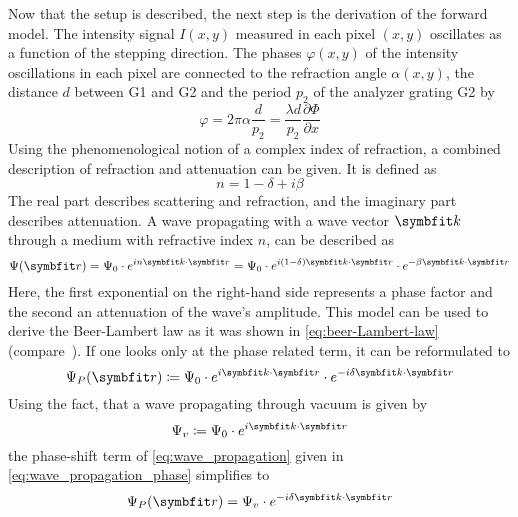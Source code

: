 Now that the setup is described, the next step is the derivation of the forward model. The intensity
signal \(I(x, y)\) measured in each pixel \((x, y)\) oscillates as a function of the stepping
direction. The phases \(\varphi(x, y)\) of the intensity oscillations in each pixel are connected to
the refraction angle \(\alpha(x, y)\), the distance \(d\) between G1 and G2 and the period \(p_2\)
of the analyzer grating G2 by~\cite{weitkamp_x-ray_2005}
\begin{equation}
	\varphi = 2 \pi \alpha \frac{d}{p_2} = \frac{\lambda d}{p_2} \frac{\partial \Phi}{\partial x}
\end{equation}
Using the phenomenological notion of a complex index of refraction, a combined description of
refraction and attenuation can be given. It is defined as
\begin{equation}
	n = 1 - \delta + i \beta
\end{equation}
The real part describes scattering and refraction, and the imaginary part describes attenuation. A
wave propagating with a wave vector \(\mvec{k}\) through a medium with refractive index \(n\), can
be described as
\begin{equation}\label{eq:wave_propagation}
	\Psi(\mvec{r}) = \Psi_0 \cdot e^{i n \mvec{k} \cdot \mvec{r}} = \Psi_0 \cdot e^{i(1-\delta)\mvec{k} \cdot \mvec{r}} \cdot e^{-\beta \mvec{k} \cdot \mvec{r}}
\end{equation}
Here, the first exponential on the right-hand side represents a phase factor and the second an
attenuation of the wave's amplitude. This model can be used to derive the Beer-Lambert law as it was
shown in \autoref{eq:beer-Lambert-law} (compare~\cite[Chapter~2.1]{hahn_statistical_2014}). If one
looks only at the phase related term, it can be reformulated to
\begin{equation}\label{eq:wave_propagation_phase}
	\Psi_P(\mvec{r}) \coloneq \Psi_0 \cdot e^{i \mvec{k} \cdot \mvec{r}} \cdot e^{-i\delta \mvec{k} \cdot \mvec{r}}
\end{equation}
Using the fact, that a wave propagating through vacuum is given by
\begin{equation}
	\Psi_v \coloneq \Psi_0 \cdot e^{i \mvec{k} \cdot \mvec{r}}
\end{equation}
the phase-shift term of \autoref{eq:wave_propagation} given in \autoref{eq:wave_propagation_phase}
simplifies to
\begin{equation}
	\Psi_P(\mvec{r}) = \Psi_v \cdot e^{-i\delta \mvec{k} \cdot \mvec{r}}
\end{equation}
